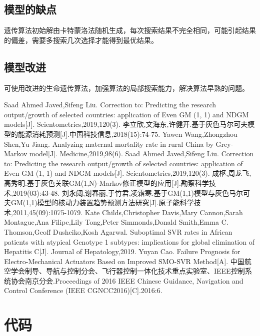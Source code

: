 \documentclass{whutmod}
\begin{document}
	\subsection{模型的缺点}
	
	遗传算法初始解由卡特蒙洛法随机生成，每次搜索结果不完全相同，可能引起结果的偏差，需要多搜索几次选择才能得到最优结果。
	\subsection{模型改进}
	可使用改进的生命遗传算法，加强算法的局部搜索能力，解决算法早熟的问题。

 
	\newpage	%
	\nocite{*}		%
%
%	
\begin{thebibliography}{9}%
	Saad Ahmed Javed,Sifeng Liu. Correction to: Predicting the research output/growth of selected countries: application of Even GM (1, 1) and NDGM models[J]. Scientometrics,2019,120(3).
	李立欣,文海东,许健开.基于灰色马尔可夫模型的能源消耗预测[J].中国科技信息,2018(15):74-75.	
	Yawen Wang,Zhongzhou Shen,Yu Jiang. Analyzing maternal mortality rate in rural China by Grey-Markov model[J]. Medicine,2019,98(6).
	Saad Ahmed Javed,Sifeng Liu. Correction to: Predicting the research output/growth of selected countries: application of Even GM (1, 1) and NDGM models[J]. Scientometrics,2019,120(3).
	成枢,周龙飞,高秀明.基于灰色关联GM(1,N)-Markov修正模型的应用[J].勘察科学技术,2019(03):43-48.
	刘永阔,谢春丽,于竹君,凌霜寒.基于GM(1,1)模型与灰色马尔可夫GM(1,1)模型的核动力装置趋势预测方法研究[J].原子能科学技术,2011,45(09):1075-1079.
	Kate Childs,Christopher Davis,Mary Cannon,Sarah Montague,Ana Filipe,Lily Tong,Peter Simmonds,Donald Smith,Emma C. Thomson,Geoff Dusheiko,Kosh Agarwal. Suboptimal SVR rates in African patients with atypical Genotype 1 subtypes: implications for global elimination of Hepatitis C[J]. Journal of Hepatology,2019.
	Yuyan Cao. Failure Prognosis for Electro-Mechanical Actuators Based on Improved SMO-SVR Method[A]. 中国航空学会制导、导航与控制分会、飞行器控制一体化技术重点实验室、IEEE控制系统协会南京分会.Proceedings of 2016 IEEE Chinese Guidance, Navigation and Control Conference (IEEE CGNCC2016)[C].2016:6.
\end{thebibliography}

	\newpage
	\appendix %

\section{代码}
\end{document}
